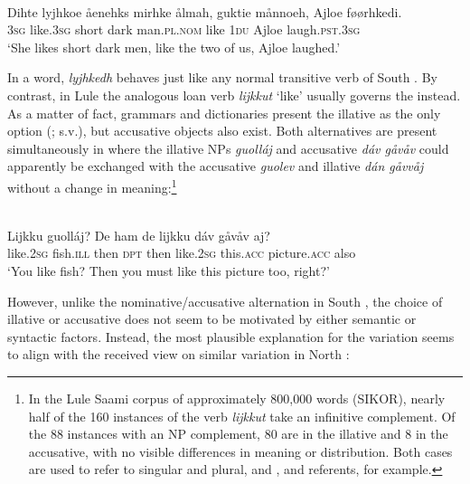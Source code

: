 \documentclass[output=paper]{LSP/langsci}
\begin{document}
\begin{exe}
\ex%
\label{16-ki-ex:9}
\\
\gll Dihte lyjhkoe åenehks mirhke ålmah, guktie månnoeh, Ajloe føørhkedi.\\
\textsc{3sg} like.\textsc{3sg} short dark man.\textsc{pl}.\textsc{nom} like \textsc{1du} Ajloe laugh.\textsc{pst}.\textsc{3sg}\\
\glt ‘She likes short dark men, like the two of us, Ajloe laughed.’
\end{exe}


In a word, \textit{lyjhkedh} behaves just like any normal transitive verb of South . By contrast, in Lule  the analogous loan verb \textit{lijkkut} ‘like’ usually governs the  instead. As a matter of fact, grammars and dictionaries present the illative as the only option (\citealt[97]{Spiik1989Lulesamisk}; \citealt{Kintel2012Julevsame} s.v.), but accusative objects also exist. Both alternatives are present simultaneously in  where the illative NPs \textit{guolláj} and accusative \textit{dáv gåvåv} could apparently be exchanged with the accusative \textit{guolev} and illative \textit{dán gåvvåj} without a change in meaning:\footnote{In the Lule Saami corpus of approximately 800,000 words (SIKOR), nearly half of the 160 instances of the verb \textit{lijkkut} take an infinitive complement. Of the 88 instances with an NP complement, 80 are in the illative and 8 in the accusative, with no visible differences in meaning or distribution. Both cases are used to refer to singular and plural,  and ,  and  referents, for example.}

\begin{exe}
\ex%
\label{16-ki-ex:10}
\\
\gll Lijkku guolláj? De ham de lijkku dáv gåvåv aj?\\
like.\textsc{2sg} fish.\textsc{ill} then \textsc{dpt} then like.\textsc{2sg} this.\textsc{acc} picture.\textsc{acc} also\\
\glt  ‘You like fish? Then you must like this picture too, right?’
\end{exe}


However, unlike the nominative/accusative alternation in South , the choice of illative or accusative does not seem to be motivated by either semantic or syntactic factors. Instead, the most plausible explanation for the variation seems to align with the received view on similar variation in North :
\end{document}
